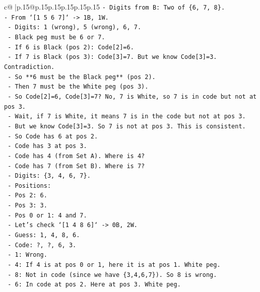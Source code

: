 \documentclass{article}
\begin{document}
{\begin{supertabular}{c@{$\;$}|p{.15\linewidth}@{}p{.15\linewidth}p{.15\linewidth}p{.15\linewidth}p{.15\linewidth}p{.15\linewidth}}
{{{\texttt{{-} Digits from B: Two of \{6, 7, 8\}.} \\
\texttt{{-} From `{[}1 5 6 7{]}` {-}> 1B, 1W.} \\
\texttt{    {-} Digits: 1 (wrong), 5 (wrong), 6, 7.} \\
\texttt{    {-} Black peg must be 6 or 7.} \\
\texttt{    {-} If 6 is Black (pos 2): Code{[}2{]}=6.} \\
\texttt{    {-} If 7 is Black (pos 3): Code{[}3{]}=7. But we know Code{[}3{]}=3. Contradiction.} \\
\texttt{    {-} So **6 must be the Black peg** (pos 2).} \\
\texttt{    {-} Then 7 must be the White peg (pos 3).} \\
\texttt{    {-} So Code{[}2{]}=6, Code{[}3{]}=7? No, 7 is White, so 7 is in code but not at pos 3.} \\
\texttt{    {-} Wait, if 7 is White, it means 7 is in the code but not at pos 3.} \\
\texttt{    {-} But we know Code{[}3{]}=3. So 7 is not at pos 3. This is consistent.} \\
\texttt{    {-} So Code has 6 at pos 2.} \\
\texttt{    {-} Code has 3 at pos 3.} \\
\texttt{    {-} Code has 4 (from Set A). Where is 4?} \\
\texttt{    {-} Code has 7 (from Set B). Where is 7?} \\
\texttt{    {-} Digits: \{3, 4, 6, 7\}.} \\
\texttt{    {-} Positions:} \\
\texttt{        {-} Pos 2: 6.} \\
\texttt{        {-} Pos 3: 3.} \\
\texttt{        {-} Pos 0 or 1: 4 and 7.} \\
\texttt{    {-} Let's check `{[}1 4 8 6{]}` {-}> 0B, 2W.} \\
\texttt{        {-} Guess: 1, 4, 8, 6.} \\
\texttt{        {-} Code: ?, ?, 6, 3.} \\
\texttt{        {-} 1: Wrong.} \\
\texttt{        {-} 4: If 4 is at pos 0 or 1, here it is at pos 1. White peg.} \\
\texttt{        {-} 8: Not in code (since we have \{3,4,6,7\}). So 8 is wrong.} \\
\texttt{        {-} 6: In code at pos 2. Here at pos 3. White peg.} \\
}}}
\end{supertabular}}
\end{document}
